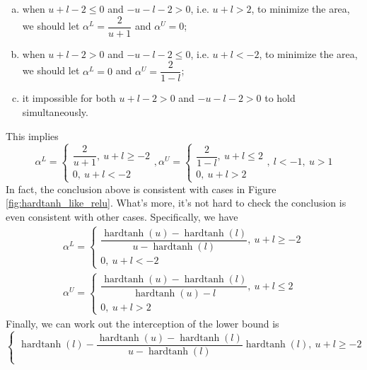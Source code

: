 \documentclass[12pt]{article}
\newcommand{\hardtanh}[1]{\operatorname{hardtanh}\left(#1\right)}
\begin{document}
\begin{enumerate}[1.]
\begin{enumerate}[(a)]
		\item when $u + l - 2 \leqslant 0$ and $-u - l - 2 > 0$, i.e. $u + l > 2$, to minimize the area, we should let $\alpha^{L} = \dfrac{2}{u + 1}$ and $\alpha^{U} = 0$;
		
		\item when $u + l - 2 > 0$ and $-u - l - 2 \leqslant 0$, i.e. $u + l < -2$, to minimize the area, we should let $\alpha^{L} = 0$ and $\alpha^{U} = \dfrac{2}{1 - l}$;
		
		\item it impossible for both $u + l - 2 > 0$ and $-u - l - 2 > 0$ to hold simultaneously.
	\end{enumerate}
	This implies
	\begin{equation}
		\alpha^{L} = \begin{cases}
			\dfrac{2}{u + 1}, \ u + l \geqslant -2\\
			0, \ u + l < -2
		\end{cases}, \alpha^{U} = \begin{cases}
			\dfrac{2}{1 - l}, \ u + l  \leqslant 2\\
			0, \ u + l > 2
		\end{cases}, \ l < -1, \ u > 1
	\end{equation}
	In fact, the conclusion above is consistent with cases in Figure \ref{fig:hardtanh_like_relu}. What's more, it's not hard to check the conclusion is even consistent with other cases. Specifically, we have
	\begin{equation}
	\begin{gathered}
		\alpha^{L} = \begin{cases}
			\dfrac{\hardtanh{u} - \hardtanh{l}}{u - \hardtanh{l}}, \ u + l \geqslant -2\\
			0, \ u + l < -2
		\end{cases}\\
		 \alpha^{U} = \begin{cases}
			\dfrac{\hardtanh{u} - \hardtanh{l}}{\hardtanh{u} - l}, \ u + l  \leqslant 2\\
			0, \ u + l > 2
		\end{cases}
	\end{gathered}
	\end{equation}
	Finally, we can work out the interception of the lower bound is
	\begin{equation}
	\begin{cases}
		\hardtanh{l} - \dfrac{\hardtanh{u} - \hardtanh{l}}{u - \hardtanh{l}} \hardtanh{l}, \ u + l \geqslant -2\\

\end{cases}
\end{equation}
\end{enumerate}
\end{document}
